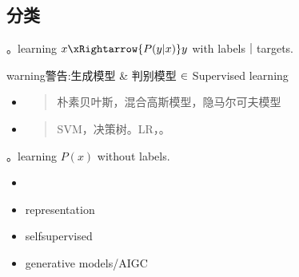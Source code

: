 \documentclass[letterpaper,10pt,english]{sphinxmanual}
\begin{document}
\subsection{分类}
\label{\detokenize{AI/main:id1}}
\sphinxAtStartPar
{} 。learning \(x \xRightarrow{P(y|x)} y\) with labels｜targets.

\begin{sphinxadmonition}{warning}{警告:}{生成模型 \& 判别模型 \protect\(\in\protect\) Supervised learning}
\end{sphinxadmonition}
\begin{itemize}
\item {} \begin{description}
\begin{quote}

\sphinxAtStartPar
朴素贝叶斯，混合高斯模型，隐马尔可夫模型
\end{quote}

\end{description}

\item {} \begin{description}
\begin{quote}

\sphinxAtStartPar
SVM，决策树。LR，。
\end{quote}

\end{description}

\end{itemize}

\sphinxAtStartPar
{} 。learning \(P(x)\) without labels.
\begin{itemize}
\item {} 
\sphinxAtStartPar
{}

\item {} 
\sphinxAtStartPar
representation

\item {} 
\sphinxAtStartPar
self\sphinxhyphen{}supervised

\item {} 
\sphinxAtStartPar
generative models/AIGC

\end{itemize}
\end{document}
